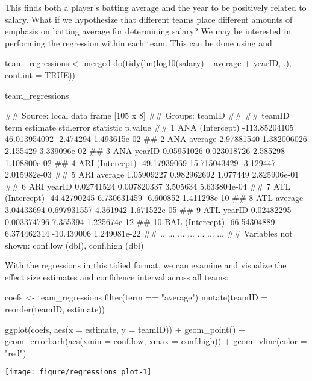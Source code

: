 This finds both a player's batting average and the year to be positively related to salary. What if we hypothesize that different teams place different amounts of emphasis on batting average for determining salary? We may be interested in performing the regression within each team. This can be done using  and .


\begin{example}
team_regressions <- merged %
    do(tidy(lm(log10(salary) ~ average + yearID, .), conf.int = TRUE))
\end{example}

\begin{example}
team_regressions
\end{example}

\begin{example}
## Source: local data frame [105 x 8]
## Groups: teamID
## 
##    teamID        term      estimate    std.error  statistic      p.value
## 1     ANA (Intercept) -113.85204105 46.013954092  -2.474294 1.493615e-02
## 2     ANA     average    2.97881540  1.382006026   2.155429 3.339096e-02
## 3     ANA      yearID    0.05951026  0.023018726   2.585298 1.108800e-02
## 4     ARI (Intercept)  -49.17939069 15.715043429  -3.129447 2.015982e-03
## 5     ARI     average    1.05909227  0.982962692   1.077449 2.825906e-01
## 6     ARI      yearID    0.02741524  0.007820337   3.505634 5.633804e-04
## 7     ATL (Intercept)  -44.42790245  6.730631459  -6.600852 1.411298e-10
## 8     ATL     average    3.04433694  0.697931557   4.361942 1.671522e-05
## 9     ATL      yearID    0.02482295  0.003374796   7.355394 1.225674e-12
## 10    BAL (Intercept)  -66.54304889  6.374462314 -10.439006 1.249081e-22
## ..    ...         ...           ...          ...        ...          ...
## Variables not shown: conf.low (dbl), conf.high (dbl)

\end{example}


With the regressions in this tidied format, we can examine and visualize the effect size estimates and confidence interval across all teams:

\begin{center}

\begin{example}
coefs <- team_regressions %
    filter(term == "average") %
    mutate(teamID = reorder(teamID, estimate))
\end{example}

\begin{example}
ggplot(coefs, aes(x = estimate, y = teamID)) + geom_point() +
    geom_errorbarh(aes(xmin = conf.low, xmax = conf.high)) +
    geom_vline(color = "red")
\end{example}

\texttt{[image: figure/regressions\_plot-1]} 
\end{center}

